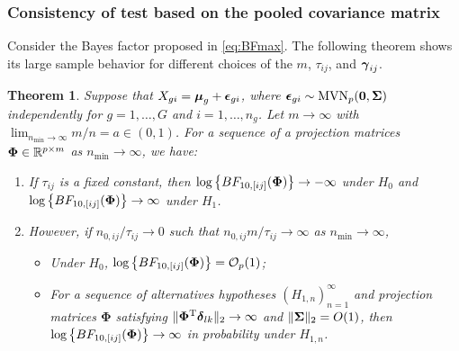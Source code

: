 \documentclass[alpha-refs]{wiley-article}
\theoremstyle{plain}%
\newtheorem{theorem}{Theorem}
\theoremstyle{definition}
\def\bzero{{\mathbf 0}}
\def\log{\hbox{log}}
\def\MVN{\hbox{MVN}}
\def\log{\hbox{log}}
\def\trans{^{\rm T}}
\def\bzero{{\mathbf 0}}
\newcommand{\bSigma}{\mbox{\boldmath $\Sigma$}}
\newcommand{\ugamma}            {\mbox{\boldmath$\gamma$}}
\newcommand{\udelta}            {\mbox{\boldmath$\delta$}}
\newcommand{\uepsilon}          {\mbox{\boldmath$\epsilon$}}
\newcommand{\umu}               {\mbox{\boldmath$\mu$}}
\newcommand{\uSigma}            {\mbox{\boldmath$\Sigma$}}
\newcommand{\uPhi}              {\mbox{\boldmath$\Phi$}}
\newcommand{\rsz}[1]{\textcolor{red}{#1}}
\begin{document}
\subsubsection{Consistency of test based on the pooled covariance matrix}
Consider the Bayes factor proposed in \eqref{eq:BFmax}. The following theorem shows its large sample behavior for different choices of the $m$, $\tau_{ij}$, and $\ugamma_{ij}$. 
\begin{theorem}\label{Thrm1}
Suppose that $X_{gi} = \umu_g + \uepsilon_{gi}$, where $\uepsilon_{gi} \sim \MVN_{p}(\bzero, \uSigma)$ independently for $g = 1, \ldots, G$ and $i = 1,\ldots,n_g$. Let $m \rightarrow \infty$ with $ \lim_{n_{\min} \rightarrow \infty} m / n =  a \in  (0, 1)$. For a sequence of a projection matrices $\uPhi \in \mathbb{R}^{p \times m}$ as $n_{\min} \rightarrow \infty$, we have:
\begin{enumerate}
    \item If $\tau_{ij}$ is a fixed constant, 
    then $\log\left\{BF_{10, [ij]}(\uPhi) \right\} \rightarrow -\infty$ under $H_0$ and $\log\left\{BF_{10, [ij]}(\uPhi) \right\} \rightarrow \infty$ under $H_1$. 
    \item However, if 
    $n_{0,ij}/\tau_{ij} \rightarrow 0$ such that $n_{0,ij}m/\tau_{ij} \rightarrow \infty$ as $n_{\min} \rightarrow \infty$,  
   
    \begin{itemize}
        \item[(a)] Under $H_0$, $\log\left\{BF_{10, [ij]}(\uPhi) \right\} = \mathcal{O}_{p}(1)$;
        \item[(b)] 
        For a sequence of alternatives hypotheses $(H_{1,n})_{n = 1}^\infty$ and projection matrices $\mathbf{\Phi}$ satisfying $\|\mathbf{\Phi}\trans\udelta_{lk}\|_2\to\infty$ and $\|\bSigma\|_2 = O(1)$, then $\log\left\{BF_{10, [ij]}(\uPhi) \right\} \rightarrow \infty$ in probability under $H_{1,n}$. 
    \end{itemize} 
\end{enumerate}
\end{theorem}
\end{document}
